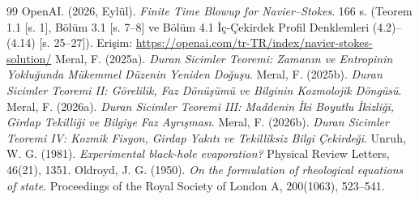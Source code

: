 \documentclass[12pt,a4paper]{article}
\begin{document}
\begin{thebibliography}{99}
     OpenAI. (2026, Eylül). \textit{Finite Time Blowup for Navier--Stokes}. 166 s. (Teorem 1.1 [s. 1], Bölüm 3.1 [s. 7--8] ve Bölüm 4.1 İç-Çekirdek Profil Denklemleri (4.2)--(4.14) [s. 25--27]). Erişim: \url{https://openai.com/tr-TR/index/navier-stokes-solution/}
     Meral, F. (2025a). \textit{Duran Sicimler Teoremi: Zamanın ve Entropinin Yokluğunda Mükemmel Düzenin Yeniden Doğuşu}.
     Meral, F. (2025b). \textit{Duran Sicimler Teoremi II: Görelilik, Faz Dönüşümü ve Bilginin Kozmolojik Döngüsü}.
     Meral, F. (2026a). \textit{Duran Sicimler Teoremi III: Maddenin İki Boyutlu İkizliği, Girdap Tekilliği ve Bilgiye Faz Ayrışması}.
     Meral, F. (2026b). \textit{Duran Sicimler Teoremi IV: Kozmik Fisyon, Girdap Yakıtı ve Tekilliksiz Bilgi Çekirdeği}.
     Unruh, W. G. (1981). \textit{Experimental black-hole evaporation?} Physical Review Letters, 46(21), 1351.
     Oldroyd, J. G. (1950). \textit{On the formulation of rheological equations of state}. Proceedings of the Royal Society of London A, 200(1063), 523--541.
\end{thebibliography}
\end{document}
